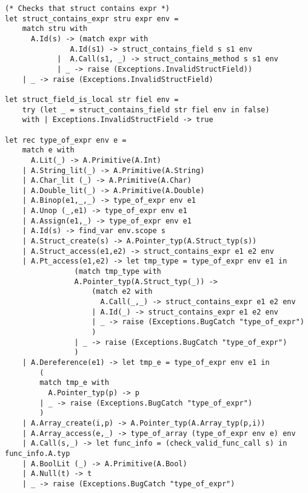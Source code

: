\documentclass{article}
\begin{document}
\begin{lstlisting}
(* Checks that struct contains expr *)
let struct_contains_expr stru expr env = 
	match stru with
	  A.Id(s) -> (match expr with 
			   A.Id(s1) -> struct_contains_field s s1 env 
			|  A.Call(s1, _) -> struct_contains_method s s1 env
			| _ -> raise (Exceptions.InvalidStructField)) 
	| _ -> raise (Exceptions.InvalidStructField)

let struct_field_is_local str fiel env =
	try (let _ = struct_contains_field str fiel env in false) 
	with | Exceptions.InvalidStructField -> true

let rec type_of_expr env e =
	match e with
	  A.Lit(_) -> A.Primitive(A.Int)
	| A.String_lit(_) -> A.Primitive(A.String)
  	| A.Char_lit (_) -> A.Primitive(A.Char)
  	| A.Double_lit(_) -> A.Primitive(A.Double)
  	| A.Binop(e1,_,_) -> type_of_expr env e1
  	| A.Unop (_,e1) -> type_of_expr env e1
  	| A.Assign(e1,_) -> type_of_expr env e1
  	| A.Id(s) -> find_var env.scope s
	| A.Struct_create(s) -> A.Pointer_typ(A.Struct_typ(s))
	| A.Struct_access(e1,e2) -> struct_contains_expr e1 e2 env
	| A.Pt_access(e1,e2) -> let tmp_type = type_of_expr env e1 in 
				(match tmp_type with
				A.Pointer_typ(A.Struct_typ(_)) -> 
					(match e2 with 
				  	  A.Call(_,_) -> struct_contains_expr e1 e2 env
				  	| A.Id(_) -> struct_contains_expr e1 e2 env
					| _ -> raise (Exceptions.BugCatch "type_of_expr")
					)
				| _ -> raise (Exceptions.BugCatch "type_of_expr")
				)
	| A.Dereference(e1) -> let tmp_e = type_of_expr env e1 in 
		(
		match tmp_e with
		  A.Pointer_typ(p) -> p
		| _ -> raise (Exceptions.BugCatch "type_of_expr")
		)
	| A.Array_create(i,p) -> A.Pointer_typ(A.Array_typ(p,i))
	| A.Array_access(e,_) -> type_of_array (type_of_expr env e) env
	| A.Call(s,_) -> let func_info = (check_valid_func_call s) in func_info.A.typ
  	| A.BoolLit (_) -> A.Primitive(A.Bool)
  	| A.Null(t) -> t
	| _ -> raise (Exceptions.BugCatch "type_of_expr")
	

\end{lstlisting}
\end{document}

